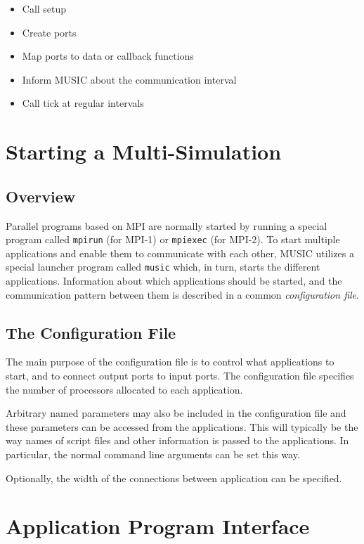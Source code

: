 \documentclass[a4paper]{report}
\begin{document}
\begin{itemize}
\item Call setup
\item Create ports
\item Map ports to data or callback functions
\item Inform MUSIC about the communication interval
\item Call tick at regular intervals
\end{itemize}


\chapter{Starting a Multi-Simulation}

\section{Overview}

Parallel programs based on MPI are normally started by running a
special program called \texttt{mpirun} (for MPI-1) or \texttt{mpiexec}
(for MPI-2).  To start multiple applications and enable them to
communicate with each other, MUSIC utilizes a special launcher program
called \texttt{music} which, in turn, starts the
different applications.  Information about which applications should
be started, and the communication pattern between them is described in
a common \emph{configuration file}.


\section{The Configuration File}

The main purpose of the configuration file is to control what
applications to start, and to connect output ports to input ports.
The configuration file specifies the number of processors allocated to
each application.

Arbitrary named parameters may also be included in the configuration
file and these parameters can be accessed from the applications.  This
will typically be the way names of script files and other information
is passed to the applications.  In particular, the normal command line
arguments can be set this way.

Optionally, the width of the connections between application can be
specified.


\chapter{Application Program Interface}
\end{document}
